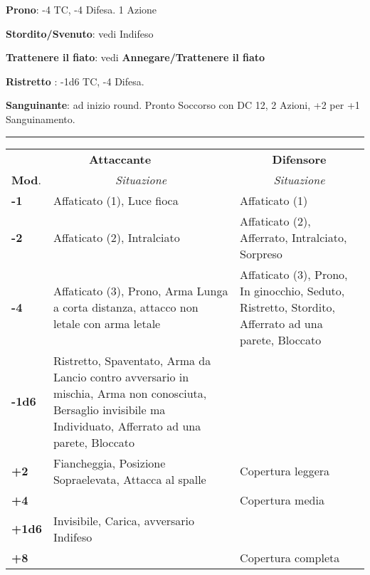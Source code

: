 \documentclass[a4paper,12 pt,openany]{book}
\newcommand{\riga}{\rule{\textwidth}{0.4pt}}
\begin{document}
\begin{textblock*}{19 cm}
\begin{multicols}{2}
\textbf{Prono}: -4 TC, -4 Difesa. 1 Azione

\textbf{Stordito/Svenuto}: vedi Indifeso

\textbf{Trattenere il fiato}: vedi \textbf{Annegare/Trattenere il fiato}

\textbf{Ristretto} : -1d6 TC, -4 Difesa.

\textbf{Sanguinante}: ad inizio round. Pronto Soccorso con DC 12, 2 Azioni, +2 per +1 Sanguinamento.

\end{multicols}

\riga


\noindent\begin{tabularx}{0.98\textwidth}{l|X|X}
	\multicolumn{2}{c}{\textbf{Attaccante}}&\multicolumn{1}{c}{\textbf{Difensore}}\\
	\textbf{Mod}.&\multicolumn{1}{c}{\emph{Situazione}}&\multicolumn{1}{c}{\emph{Situazione}}\\
	\textbf{-1}& Affaticato (1), Luce fioca&Affaticato (1)\\
	\hline
	\textbf{-2}& Affaticato (2), Intralciato & Affaticato (2), Afferrato, Intralciato, Sorpreso\\
	\hline
	\textbf{-4}& Affaticato (3), Prono, Arma Lunga a corta distanza, attacco non letale con arma letale& Affaticato (3), Prono, In ginocchio, Seduto, Ristretto, Stordito, Afferrato ad una parete, Bloccato\\
	\hline
	\textbf{-1d6}& Ristretto, Spaventato, Arma da Lancio contro avversario in mischia, Arma non conosciuta, Bersaglio invisibile ma Individuato, Afferrato ad una parete, Bloccato&\\
	\hline
	\textbf{+2}& Fiancheggia, Posizione Sopraelevata, Attacca al spalle& Copertura leggera\\
	\hline
	\textbf{+4}&& Copertura media\\
	\hline
	\textbf{+1d6}& Invisibile, Carica, avversario Indifeso& \\
	\hline
	\textbf{+8}&& Copertura completa
\end{tabularx}



\end{textblock*}

~\newpage
\end{document}
